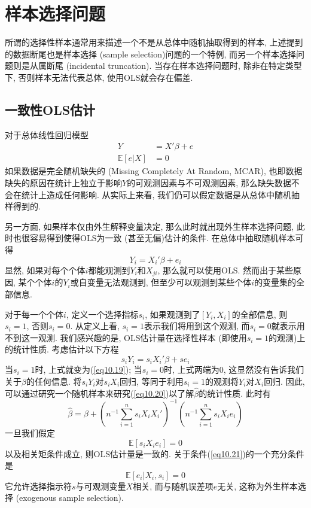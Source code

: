 \documentclass[cn, 12pt, math=mtpro2, bibstyle=apa, blue, twocol]{elegantbook}
\newcommand{\E}{\mathbb{E}}
\newcommand{\hb}{\hat{\beta}}
\begin{document}
\section{样本选择问题}
所谓的选择性样本通常用来描述一个不是从总体中随机抽取得到的样本, 上述提到的数据断尾也是样本选择 (sample selection)问题的一个特例, 而另一个样本选择问题则是从属断尾 (incidental truncation). 当存在样本选择问题时, 除非在特定类型下, 否则样本无法代表总体, 使用OLS就会存在偏差.
\subsection{一致性OLS估计}
对于总体线性回归模型
\begin{align}
Y&=X'\beta+e \nonumber \\
\E[e|X]&=0 \label{eq10.23}
\end{align}
如果数据是完全随机缺失的 (Missing Completely At Random, MCAR), 也即数据缺失的原因在统计上独立于影响$Y$的可观测因素与不可观测因素, 那么缺失数据不会在统计上造成任何影响. 从实际上来看, 我们仍可以假定数据是从总体中随机抽样得到的.

另一方面, 如果样本仅由外生解释变量决定, 那么此时就出现外生样本选择问题, 此时也很容易得到使得OLS为一致 (甚至无偏)估计的条件. 在总体中抽取随机样本可得
\begin{equation}\label{eq10.19}
  Y_i=X_i'\beta+e_i
\end{equation}
显然, 如果对每个个体$i$都能观测到$Y_i$和$X_{ji}$, 那么就可以使用OLS. 然而出于某些原因, 某个个体$i$的$Y_i$或自变量无法观测到, 但至少可以观测到某些个体$i$的变量集的全部信息.

对于每一个个体$i$, 定义一个选择指标$s_i$, 如果观测到了$[Y_i,X_i]$的全部信息, 则$s_i=1$, 否则$s_i=0$. 从定义上看, $s_i=1$表示我们将用到这个观测, 而$s_i=0$就表示用不到这一观测. 我们感兴趣的是, OLS估计量在选择性样本 (即使用$s_i=1$的观测)上的统计性质. 考虑估计以下方程
\begin{equation}\label{eq10.20}
  s_iY_i=s_iX_i'\beta+se_i
\end{equation}
当$s_i=1$时, 上式就变为(\ref{eq10.19}); 当$s_i=0$时, 上式两端为0, 这显然没有告诉我们关于$\beta$的任何信息. 将$s_iY_i$对$s_iX_i$回归, 等同于利用$s_i=1$的观测将$Y_i$对$X_i$回归. 因此, 可以通过研究一个随机样本来研究(\ref{eq10.20})以了解$\hb$的统计性质. 此时有
$$\hb=\beta+\left(n^{-1}\sum_{i=1}^{n}s_iX_iX_i'\right)^{-1}\left(n^{-1}\sum_{i=1}^{n}s_iX_ie_i\right)$$
一旦我们假定
\begin{equation}\label{eq10.21}
  \E[s_iX_ie_i]=0
\end{equation}
以及相关矩条件成立, 则OLS估计量是一致的. 关于条件(\ref{eq10.21})的一个充分条件是
\begin{equation}\label{eq10.22}
  \E[e_i|X_i,s_i]=0
\end{equation}
它允许选择指示符$s$与可观测变量$X$相关, 而与随机误差项$e$无关, 这称为外生样本选择 (exogenous sample selection).
\end{document}
